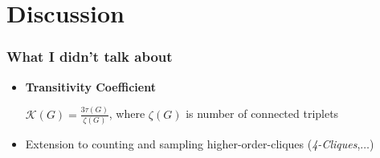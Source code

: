 \documentclass[11pt]{beamer}
\begin{document}
\section{Discussion}
\begin{frame}
\frametitle{What I didn't talk about}
\begin{itemize}
\item \textbf{Transitivity Coefficient}
\begin{center}
$\mathcal{K}(G)=\frac{3\tau(G)}{\zeta(G)}$, where $\zeta(G)$ is number of connected triplets
\end{center}
\item Extension to counting and sampling higher-order-cliques (\textit{4-Cliques},$\dots$)
\end{itemize}
\end{frame}
\end{document}
